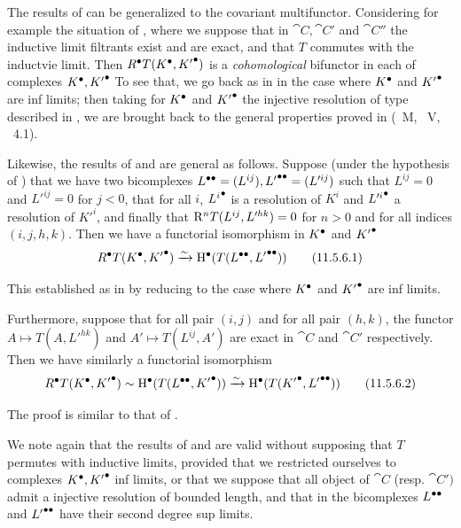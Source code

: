 \begin{env}[11.5.5]
\label{0.11.5.5}
The results of  can be generalized to the covariant multifunctor.
Considering for example the situation of , where we suppose that in $\cat{C}, \cat{C'}$ and $\cat{C''}$ 
the inductive limit filtrants exist and are exact, and that $T$ commutes with the inductvie limit.
Then ${R}^{\bullet}T({K}^{\bullet}, {K'}^{\bullet})$ is a \emph{cohomological} bifunctor in each of complexes ${K}^{\bullet}, {K'}^{\bullet}$
To see that, we go back as in  in the case where ${K}^{\bullet}$ and ${K'}^{\bullet}$ are inf limits; 
then taking for ${K}^{\bullet}$ and ${K'}^{\bullet}$ the injective resolution of type described in , 
we are brought back to the general properties proved in (~M, ~V, ~4.1).
\end{env}

\begin{env}[11.5.6]
\label{0.11.5.6}
Likewise, the results of  and  are general as follows.
Suppose (under the hypothesis of ) that we have two bicomplexes ${L}^{\bullet\bullet} = (L^{ij}), {L'}^{\bullet\bullet} = (L'^{ij})$ such that $L^{ij} = 0$ and $L'^{ij} = 0$ for $j<0$, 
that for all $i$, ${L^i}^{\bullet}$ is a resolution of $K^i$ and ${L'^i}^{\bullet}$ a resolution of $K'^i$, and finally that $\mathrm{R}^n T(L^{ij}, L'^{hk})=0$ for $n>0$ and for all indices $(i,j,h,k)$.
Then we have a functorial isomorphism in ${K}^{\bullet}$ and ${K'}^{\bullet}$
\[
  \label{0.11.5.6.1}
  {R}^{\bullet}T({K}^{\bullet}, {K'}^{\bullet}) \xrightarrow{\sim} {\mathrm{H}}^{\bullet}(T({L}^{\bullet\bullet}, {L'}^{\bullet\bullet}))
  \tag{11.5.6.1}
\]

This established as in  by reducing to the case where ${K}^{\bullet}$ and ${K'}^{\bullet}$ are inf limits.

Furthermore, suppose that for all pair $(i,j)$ and for all pair $(h,k)$, the functor $A\mapsto T(A, L'^{hk})$ and $A'\mapsto T(L^{ij}, A')$ 
are exact in $\cat{C}$ and $\cat{C'}$ respectively. Then we have similarly a functorial isomorphism
\[
  \label{0.11.5.6.2}
  {R}^{\bullet}T({K}^{\bullet}, {K'}^{\bullet}) \sim {\mathrm{H}}^{\bullet}(T({L}^{\bullet\bullet}, {K'}^{\bullet})) \xrightarrow{\sim} {\mathrm{H}}^{\bullet}(T({K'}^{\bullet}, {L'}^{\bullet\bullet}))
  \tag{11.5.6.2}
\]

The proof is similar to that of .
\end{env}

\begin{env}[11.5.7]
\label{0.11.5.7}
We note again that the results of  and  are valid without supposing that $T$ permutes with inductive limits, 
provided that we restricted ourselves to complexes ${K}^{\bullet}, {K'}^{\bullet}$ inf limits, or that we suppose that all object of $\cat{C}$ (resp. $\cat{C'})$ 
admit a injective resolution of bounded length, and that in  the bicomplexes ${L}^{\bullet\bullet}$ and ${L'}^{\bullet\bullet}$ have their second degree sup limits.
\end{env}

